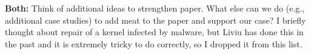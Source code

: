 \begin{mylist}
\item{\bf Both:} Think of additional ideas to strengthen paper. What else can
we do (e.g., additional case studies) to add meat to the paper and support our
case? I briefly thought about repair of a kernel infected by malware, but Liviu
has done this in the past and it is extremely tricky to do correctly, so I
dropped it from this list.

\end{mylist}
